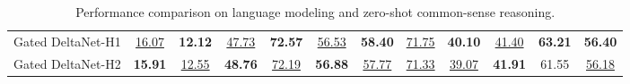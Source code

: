 \documentclass{article}
\begin{document}
\begin{table}[t!]
\begin{tabular}{l|cc|ccccccccc}
\hspace{2mm} Gated DeltaNet-H1 & \underline{16.07} & \textbf{12.12} & \underline{47.73} & \textbf{72.57} & \underline{56.53} &\textbf{58.40} & \underline{71.75}	& \textbf{40.10} &  \underline{41.40}  & \textbf{63.21} &  \textbf{56.40} \\
\hspace{2mm}  Gated DeltaNet-H2 & \textbf{15.91} &\underline{12.55} & \textbf{48.76} & \underline{72.19} & \textbf{56.88} &	\underline{57.77} & \underline{71.33}	 &\underline{39.07} &  \textbf{41.91}  & 61.55   & \underline{56.18}  \\
\bottomrule
\end{tabular}
\addtolength{\tabcolsep}{2.5pt}    
\centering
\caption{
Performance comparison on language modeling and zero-shot common-sense reasoning.
}
\label{tab:commonsense_results}
\vspace{-4mm}
\end{table}
\label{sec:lang_model}
\end{document}
